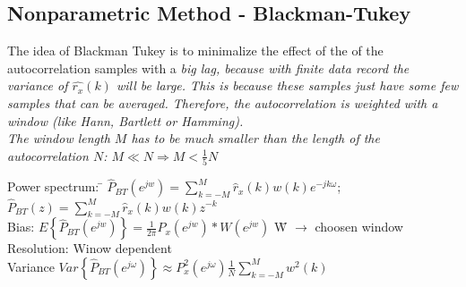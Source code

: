 \subsection{Nonparametric Method - Blackman-Tukey }
The idea of Blackman Tukey is to minimalize the effect of the of the autocorrelation samples with a \em big lag\em, because with finite data record the variance of $\hat{r_x}(k)$ will be large.
This is because these samples just have some few samples that can be averaged.
Therefore, the autocorrelation is weighted with a window (like Hann, Bartlett or Hamming).\\
The window length $M$ has to be much smaller than the length of the autocorrelation $N$: $M  \ll N \Rightarrow M < \frac{1}{5}N$
\begin{tabbing}
Power spectrum:  	\=  $\hat{P}_{BT}(e^{jw}) =  \sum\limits_{k=-M}^{M} \hat{r}_x(k)w(k)e^{-jk\omega}$;   
$\hat{P}_{BT}(z) =  \sum\limits_{k=-M}^{M} \hat{r}_x(k)w(k)z^{-k}$   \\
Bias: 				\>  $E\left\lbrace \hat{P}_{BT}(e^{jw}) \right\rbrace = \frac{1}{2 \pi}P_x(e^{jw})*W(e^{jw})$  \hspace{2cm} \= W $\to$ choosen window\\
Resolution: 		\>  Winow dependent\\
Variance 			\> $Var\left\lbrace\hat{P}_{BT}(e^{j\omega})\right\rbrace \approx P^2_x(e^{j\omega}) \frac{1}{N} \sum\limits_{k=-M}^{M}w^2(k)$\\
\end{tabbing}

